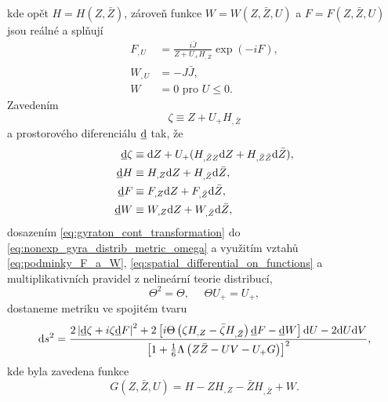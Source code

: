 kde opět $H = H(Z, \bar{Z})$, zároveň funkce $W = W(Z, \bar{Z}, U)$ a $F = F(Z, \bar{Z}, U)$ jsou reálné a splňují
\begin{equation}
    \label{eq:podminky_F_a_W}
    \begin{split}
        F_{,U} &= \frac{i\bar{J}}{Z + U_{+}H_{,\bar{Z}}} \exp{\left(-iF\right)}, \\
        W_{,U} &= -J \bar{J}, \\
        W &= 0 \text{ pro } U \leq 0.
    \end{split}
\end{equation}
Zavedením
\begin{equation}
    \zeta \equiv Z + U_{+} H_{,\bar{Z}}
\end{equation}
a prostorového diferenciálu $\underline{\mathrm{d}}$ tak, že
\begin{equation}
    \label{eq:spatial_differential_on_functions}
    \begin{split}
        \underline{\mathrm{d}}\zeta &\equiv \mathrm{d} Z + U_{+}(H_{,\bar{Z}Z}\mathrm{d} Z + H_{,\bar{Z}\bar{Z}}\mathrm{d} \bar{Z}), \\
        \underline{\mathrm{d}}H &\equiv H_{,Z}\mathrm{d} Z + H_{,\bar{Z}}\mathrm{d} \bar{Z}, \\
        \underline{\mathrm{d}}F &\equiv F_{,Z}\mathrm{d} Z + F_{,\bar{Z}}\mathrm{d} \bar{Z}, \\
        \underline{\mathrm{d}}W &\equiv W_{,Z}\mathrm{d} Z + W_{,\bar{Z}}\mathrm{d} \bar{Z},
    \end{split}
\end{equation}
dosazením \eqref{eq:gyraton_cont_transformation} do \eqref{eq:nonexp_gyra_distrib_metric_omega} a využitím vztahů \eqref{eq:podminky_F_a_W},
\eqref{eq:spatial_differential_on_functions} a multiplikativních pravidel z nelineární teorie distribucí,
\begin{equation}
    \label{eq:pravidla_distribuce}
    \Theta^2 = \Theta, ~~~~~~ \Theta U_{+} = U_{+},
\end{equation}
dostaneme metriku ve spojitém tvaru
\begin{equation}
    \label{eq:spojita_gyratonova_metrika}
    \mathrm{d} s^2 = \frac{2 \left|\underline{\mathrm{d}} \zeta + i \zeta \underline{\mathrm{d}}F\right|^2 + 2 \left[i \Theta\left(\zeta H_{,Z} - \bar{\zeta} H_{,\bar{Z}}\right) \underline{\mathrm{d}}F - \underline{\mathrm{d}}W\right] \mathrm{d} U - 2\mathrm{d} U \mathrm{d} V}{\left[1+\frac{1}{6}\Lambda\left(Z \bar{Z} - UV - U_{+}G\right)\right]^2},
\end{equation}
kde byla zavedena funkce
\begin{equation}
    G \left( Z, \bar{Z}, U \right) = H - Z H_{,Z} - \bar{Z} H_{,\bar{Z}} + W.
\end{equation}

